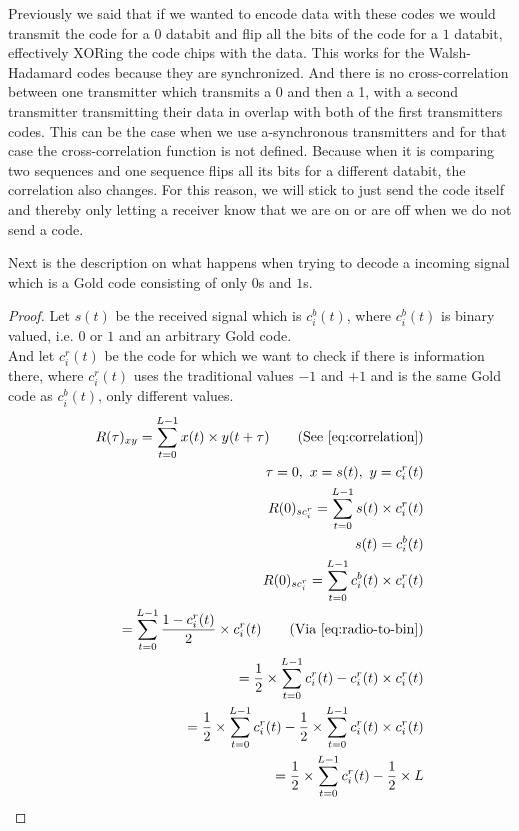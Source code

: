 		Previously we said that if we wanted to encode data with these codes we would transmit the code for a $0$ databit and flip all the bits of the code for a $1$ databit, effectively XORing the code chips with the data.
		This works for the Walsh-Hadamard codes because they are synchronized. 
		And there is no cross-correlation between one transmitter which transmits a 0 and then a 1, with a second transmitter transmitting their data in overlap with both of the first transmitters codes.
		This can be the case when we use a-synchronous transmitters and for that case the cross-correlation function is not defined.
		Because when it is comparing two sequences and one sequence flips all its bits for a different databit, the correlation also changes. 
		For this reason, we will stick to just send the code itself and thereby only letting a receiver know that we are on or are off when we do not send a code.

		Next is the description on what happens when trying to decode a incoming signal which is a Gold code consisting of only $0$s and $1$s.

		\begin{proof}
			Let $s(t)$ be the received signal which is $c^b_i(t)$, where $c^b_i(t)$ is binary valued, i.e. $0$ or $1$ and an arbitrary Gold code.\\
			And let $c^r_i(t)$ be the code for which we want to check if there is information there, where $c^r_i(t)$ uses the traditional values $-1$ and $+1$ and is the same Gold code as $c^b_i(t)$, only different values. \\

			\begin{align*}
				R(\tau)_{xy} = \displaystyle\sum_{t = 0} ^ {L - 1} x(t) \times y(t + \tau)	\tag{See \autoref{eq:correlation}}
				\\ \tau = 0,\ x = s(t),\ y = c^r_i(t)	
				\\ R(0)_{sc^r_{i}} = \displaystyle\sum_{t = 0} ^ {L - 1} s(t) \times c^r_i(t)	
				\\ s(t) = c^b_i(t) 									
				\\ R(0)_{sc^r_{i}} = \displaystyle\sum_{t = 0} ^ {L - 1} c^b_i(t) \times c^r_i(t)
				\\ = \displaystyle\sum_{t = 0} ^ {L - 1} \frac{1 - c^r_i(t)}{2} \times c^r_i(t) \tag{Via \autoref{eq:radio-to-bin}}
				\\ = \frac{1}{2} \times \displaystyle\sum_{t = 0} ^ {L - 1} c^r_i(t) - c^r_i(t) \times c^r_i(t)
				\\ = \frac{1}{2} \times \displaystyle\sum_{t = 0} ^ {L - 1} c^r_i(t) - \frac{1}{2} \times \displaystyle\sum_{t = 0} ^ {L - 1} c^r_i(t) \times c^r_i(t)
				\\ = \frac{1}{2} \times \displaystyle\sum_{t = 0} ^ {L - 1} c^r_i(t) - \frac{1}{2} \times L
			\end{align*}

		\end{proof}

